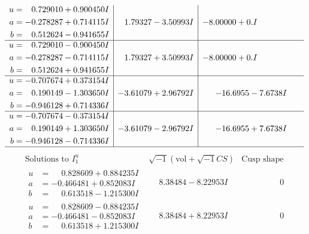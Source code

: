 \documentclass[1p]{elsarticle_modified}
\theoremstyle{definition}
\newcommand{\I}{\sqrt{-1}}
\begin{document}
$$\begin{array}{c|c|c}
\begin{aligned}
u &= \phantom{-}0.729010 + 0.900450 I \\
a &= -0.278287 + 0.714115 I \\
b &= \phantom{-}0.512624 - 0.941655 I\end{aligned}
 & \phantom{-}1.79327 - 3.50993 I & -8.00000 + 0. I\phantom{ +0.000000I} \\ \hline\begin{aligned}
u &= \phantom{-}0.729010 - 0.900450 I \\
a &= -0.278287 - 0.714115 I \\
b &= \phantom{-}0.512624 + 0.941655 I\end{aligned}
 & \phantom{-}1.79327 + 3.50993 I & -8.00000 + 0. I\phantom{ +0.000000I} \\ \hline\begin{aligned}
u &= -0.707674 + 0.373154 I \\
a &= \phantom{-}0.190149 - 1.303650 I \\
b &= -0.946128 + 0.714336 I\end{aligned}
 & -3.61079 + 2.96792 I & -16.6955 - 7.6738 I \\ \hline\begin{aligned}
u &= -0.707674 - 0.373154 I \\
a &= \phantom{-}0.190149 + 1.303650 I \\
b &= -0.946128 - 0.714336 I\end{aligned}
 & -3.61079 - 2.96792 I & -16.6955 + 7.6738 I\\
 \hline 
 \end{array}$$\newpage$$\begin{array}{c|c|c}  
\text{Solutions to }I^u_{1}& \I (\text{vol} + \sqrt{-1}CS) & \text{Cusp shape}\\
 \hline 
\begin{aligned}
u &= \phantom{-}0.828609 + 0.884235 I \\
a &= -0.466481 + 0.852083 I \\
b &= \phantom{-}0.613518 - 1.215300 I\end{aligned}
 & \phantom{-}8.38484 - 8.22953 I & \phantom{-0.000000 } 0 \\ \hline\begin{aligned}
u &= \phantom{-}0.828609 - 0.884235 I \\
a &= -0.466481 - 0.852083 I \\
b &= \phantom{-}0.613518 + 1.215300 I\end{aligned}
 & \phantom{-}8.38484 + 8.22953 I & \phantom{-0.000000 } 0 \\ \hline\begin{aligned}

\end{aligned}
\end{array}$$
\end{document}
